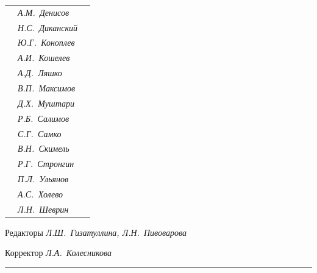 \begin{tabular}{p{63mm}p{40mm}p{50mm}}
                               &   \it А.М.~Денисов & \\


                               &   \it Н.С.~Диканский & \\


                               &   \it Ю.Г.~Коноплев & \\


                               &   \it А.И.~Кошелев  & \\


                               &   \it А.Д.~Ляшко  & \\


                               &   \it В.П.~Максимов  & \\


                               &   \it Д.Х.~Муштари & \\


                               &   \it Р.Б.~Салимов  & \\


                               &   \it С.Г.~Самко  & \\


                               &   \it В.Н.~Скимель &  \\


                               &   \it Р.Г.~Стронгин  & \\


                               &   \it П.Л.~Ульянов  & \\


                               &   \it А.С.~Холево  & \\


                               &   \it Л.Н.~Шеврин  & \\


\end{tabular} 


\bigskip 


\bigskip 


\bigskip 





 


\centerline{Редакторы \it Л.Ш.~Гизатуллина, Л.Н.~Пивоварова}


\centerline{Корректор \it Л.А.~Колесникова}


\bigskip 


\hrule 


